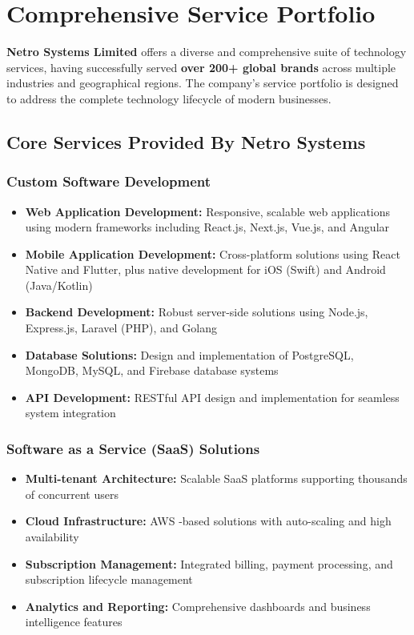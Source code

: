 \documentclass[12pt,a4paper]{report}
\newcommand{\company}[1]{\textcolor{companycolor}{\textbf{#1}}}
\newcommand{\skill}[1]{\textcolor{skillcolor}{\textbf{#1}}}
\newcommand{\impact}[1]{\textcolor{impactcolor}{\textbf{#1}}}
\let\oldcite\cite
\renewcommand{\cite}[1]{\textcolor{impactcolor}{\oldcite{#1}}}
\newenvironment{coloritemize}
{\begin{itemize}[label=\textcolor{primaryblue}{$\bullet$}]}
{\end{itemize}}
\begin{document}
\newpage
\section{Comprehensive Service Portfolio}
\company{Netro Systems Limited} offers a diverse and comprehensive suite of technology services, having successfully served \impact{over 200+ global brands} across multiple industries and geographical regions. The company's service portfolio is designed to address the complete technology lifecycle of modern businesses.

\subsection{Core Services Provided By Netro Systems}

\subsubsection{Custom Software Development}
\begin{coloritemize}
    \item \skill{Web Application Development:} Responsive, scalable web applications using modern frameworks including React.js, Next.js, Vue.js, and Angular
    \item \skill{Mobile Application Development:} Cross-platform solutions using React Native and Flutter, plus native development for iOS (Swift) and Android (Java/Kotlin)
    \item \skill{Backend Development:} Robust server-side solutions using Node.js, Express.js, Laravel (PHP), and Golang
    \item \skill{Database Solutions:} Design and implementation of PostgreSQL, MongoDB, MySQL, and Firebase database systems
    \item \skill{API Development:} RESTful API design and implementation for seamless system integration
\end{coloritemize}

\subsubsection{Software as a Service (SaaS) Solutions}
\begin{coloritemize}
    \item \skill{Multi-tenant Architecture:} Scalable SaaS platforms supporting thousands of concurrent users
    \item \skill{Cloud Infrastructure:} AWS \cite{ref7}-based solutions with auto-scaling and high availability
    \item \skill{Subscription Management:} Integrated billing, payment processing, and subscription lifecycle management
    \item \skill{Analytics and Reporting:} Comprehensive dashboards and business intelligence features
\end{coloritemize}
\end{document}
